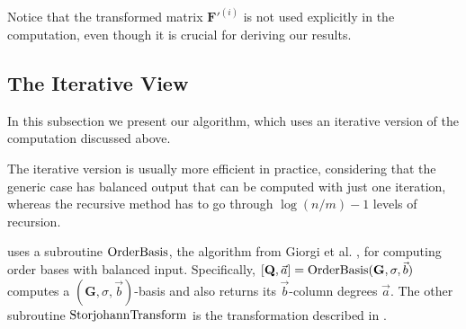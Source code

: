 Notice that the transformed matrix $\mathbf{F}'^{\left(i\right)}$
is not used explicitly in the computation, even though it is crucial
for deriving our results.


\subsection{The Iterative View}

In this subsection we present our algorithm, which uses an iterative
version of the computation discussed above.%
\begin{comment}
The recursive top-down approach of the previous subsection is useful
for giving an overall picture of the computation process. Algorithm
\prettyref{alg:mab} uses an equivalent corresponding bottom-up iterative
approach. 
\end{comment}
{}%
\begin{comment}
, allowing the complexity to be more easily analyzed. 
\end{comment}
{}%
\begin{comment}
. In practice, bottom-up iterative approaches are more efficient than
the corresponding top-down recursive approaches. For our purpose,
it is also easier to analyze the computational cost of the iterative
procedure. 
\end{comment}
{} The iterative version is usually more efficient in practice, considering
that the generic case has balanced output that can be computed with
just one iteration, whereas the recursive method has to go through
$\log(n/m)-1$ levels of recursion.

 uses a subroutine $\mab$, the algorithm from
Giorgi et al. \citeyearpar{Giorgi2003}, for computing order bases
with balanced input. Specifically, $\left[\mathbf{Q},\vec{a}\right]=\mab(\mathbf{G},\sigma,\vec{b})$
computes a $(\mathbf{G},\sigma,\vec{b})$-basis and also returns its
$\vec{b}$-column degrees $\vec{a}$. The other subroutine $\StorjohannTransform$
is the transformation described in .

